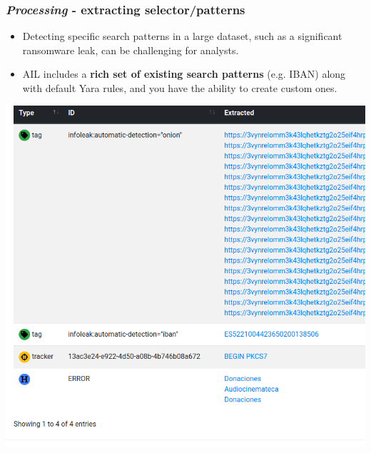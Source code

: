 \documentclass{beamer}
\begin{document}
\begin{frame}
   \frametitle{{\it Processing} - extracting selector/patterns}
	\begin{itemize}
		\item Detecting specific search patterns in a large dataset, such as a significant ransomware leak, can be challenging for analysts.
        \item AIL includes a {\bf rich set of existing search patterns} (e.g. IBAN) along with default Yara rules, and you have the ability to create custom ones.
	\end{itemize}
   \begin{center}
        \includegraphics[scale=0.15]{images/ail-detecting.png}
    \end{center}
\end{frame}
\end{document}
